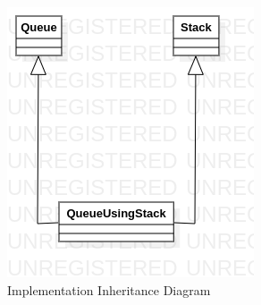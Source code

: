

\begin{figure}[H]
	\centering 
	\includegraphics[clip, trim=0cm 0cm 0cm 0cm, scale=0.3]{q5/images/q5_classdiagram.png}
	\caption{Implementation Inheritance Diagram}
\end{figure}

\noindent\begin{minipage}{.45\textwidth}
	
\end{minipage}\hfill
\begin{minipage}{.45\textwidth}
	
\end{minipage}
\clearpage

